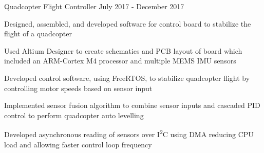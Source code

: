 \begin{cventries}
  \cventry
    {Quadcopter Flight Controller} %
    {} %
    {} %
    {July 2017 - December 2017} %
    {
      \begin{cvitems} %
        \item {Designed, assembled, and developed software for control board to stabilize the flight of a quadcopter}
        \item {Used Altium Designer to create schematics and PCB layout of board which included an ARM-Cortex M4 processor and multiple MEMS IMU sensors}
        \item {Developed control software, using FreeRTOS, to stabilize quadcopter flight by controlling motor speeds based on sensor input}
        \item {Implemented sensor fusion algorithm to combine sensor inputs and cascaded PID control to perform quadcopter auto levelling}
        \item {Developed asynchronous reading of sensors over I\textsuperscript{2}C using DMA reducing CPU load and allowing faster control loop frequency}
      \end{cvitems}
    }


\end{cventries}

